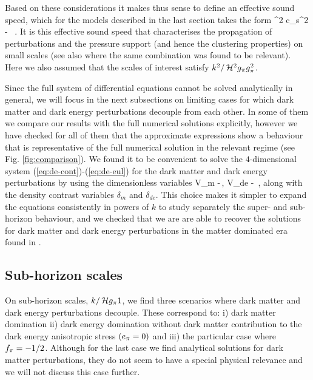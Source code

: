 Based on these considerations it makes thus sense to define an effective sound speed, which for the models described in the last section takes the form 
\be 
\ceff^2 \equiv c_s^2 - \, .
\label{eq:pheno2}
\ee
It is this effective sound speed that characterises the propagation of perturbations and the pressure support (and hence the clustering properties) on small scales (see
also \cite{Sapone:2012nh,Sawicki:2012re,Sapone:2013wda} where the same combination was found to be relevant). Here we
also assumed that the scales of interest satisfy $ k^2/\H^2 \mug \gg^2 $.

Since the full system of differential equations cannot be solved analytically in general, we will focus in the next subsections on limiting cases for which dark matter and dark energy perturbations decouple from each other. In some of them we compare our results with the full numerical solutions explicitly, however we have checked for all of them that the approximate expressions show a behaviour that is representative of the full numerical solution in the relevant regime (see Fig. \ref{fig:comparison}).
We found it to be convenient to solve the $4$-dimensional system (\ref{eq:de-cont})-(\ref{eq:de-eul}) for the dark matter and dark energy perturbations by using the dimensionless variables  
\be
V_m \equiv  -\,, \quad
V_{de} \equiv - \,,
\label{eq:pheno3} 
\ee
along with the density contrast variables $ \delta_m$ and $ \delta_{de}$. This choice makes it simpler to expand the equations consistently in powers of $k$ 
to study separately the super- and sub-horizon behaviour, and we checked that we are
are able to recover the solutions for dark matter and dark energy perturbations in the matter dominated era found in \cite{Sapone:2009kx}. 

\subsection{Sub-horizon scales}\label{subsection:4.1}

On sub-horizon scales, $ k/\H \mug  1 $, we find three scenarios where dark matter and dark energy perturbations decouple. These correspond to: i) dark matter domination ii) dark energy domination without dark matter contribution to the dark energy anisotropic stress $ (\aa = 0) $ and iii) the particular case where $ \ff = -1/2 $. Although for the last case we find analytical solutions for dark matter perturbations, they do not seem to have a special physical relevance and we will not discuss this case further.

